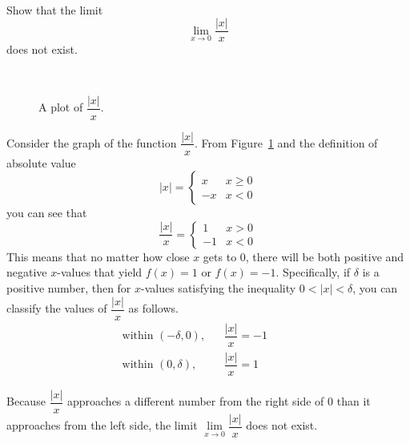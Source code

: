 \begin{example}\cite{ci}
    ~\\
    Show that the limit 
    $$\displaystyle\lim\limits_{x\to 0} \dfrac{|x|}{x}$$
    does not exist.\\
    \begin{solution}~\newline
        \begin{figure}[H]
            \centering
            \caption{A plot of $\dfrac{|x|}{x}$.}
            \label{plot:abs(x)/x}
        \end{figure}
        Consider the graph of the function $\dfrac{|x|}{x}$. From 
        Figure~\ref{plot:abs(x)/x} and 
        the definition of absolute value
        \[ |x| = 
            \begin{cases} 
            x   & x\geq 0 \\
            -x  & x < 0 
            \end{cases}
        \]
        you can see that
        \[ \dfrac{|x|}{x} = 
            \begin{cases} 
            1   & x > 0 \\
            -1  & x < 0 
            \end{cases}
        \]
        This means that no matter how close $x$ gets to $0$, there will be both positive and negative $x$-values that yield $f(x)=1$ or $f(x)=-1$. Specifically, if $\delta$ is a positive number, then for $x$-values satisfying the inequality $0 < |x| < \delta$, you can classify the values of $\dfrac{|x|}{x}$ as follows.
        \begin{align*}
            &\text{within }(-\delta, 0), &&\dfrac{|x|}{x} = -1&& &&\\
            &\text{within }(0, \delta),  &&\dfrac{|x|}{x} = 1&& &&
        \end{align*}

        Because $\dfrac{|x|}{x}$ approaches a different number from the right side of 0 than it approaches from the left side, the limit $\displaystyle\lim\limits_{x\to 0}\dfrac{|x|}{x}$ does not exist.
    \end{solution}
\end{example}

